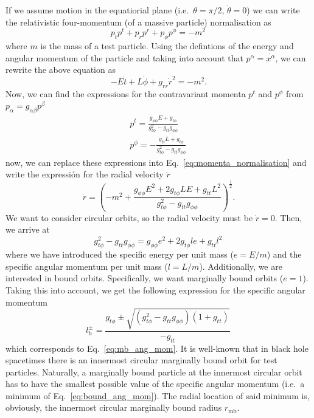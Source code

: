 \documentclass[twocolumn,aps,showpacs,showkeys,prd,superscriptaddress,byrevtex, amsmath]{revtex4-1}
\begin{document}
\begin{appendix}
If we assume motion in the equatiorial plane (i.e.~$\theta = \pi/2$, $\dot{\theta} = 0$) we can write the relativistic four-momentum (of a massive particle) normalisation as
\begin{equation}\label{eq:momenta_normalisation}
p_{t}p^t + p_{r}p^r + p_{\phi}p^{\phi} = -m^2\,
\end{equation}
where $m$ is the mass of a test particle. Using the defintions of the energy and angular momentum of the particle and taking into account that $p^{\alpha} = \dot{x^{\alpha}}$, we can rewrite the above equation as
\begin{equation}
-E \dot{t} + L \dot{\phi} + g_{rr} \dot{r}^2 = -m^2.
\end{equation}
Now, we can find the expressions for the contravariant momenta $p^{t}$ and $p^{\phi}$ from $p_{\alpha} = g_{\alpha \beta}p^{\beta}$
\begin{eqnarray}
p^{t} = \frac{g_{\phi\phi}E + g_{t\phi}}{g_{t\phi}^2-g_{tt}g_{\phi\phi}}
\\
p^{\phi} = -\frac{g_{tt}L+g_{t\phi}}{g_{t\phi}^2-g_{tt}g_{\phi\phi}}\,
\end{eqnarray}
now, we can replace these expressions into Eq.~\eqref{eq:momenta_normalisation} and write the expressión for the radial velocity $\dot{r}$
\begin{equation}\label{eq:radial_velocity}
\dot{r} = \left(-m^2+\frac{g_{\phi\phi}E^2+2 g_{t\phi}LE+g_{tt}L^2}{g_{t\phi}^2-g_{tt}g_{\phi\phi}}\right)^{\frac{1}{2}}.
\end{equation}
We want to consider circular orbits, so the radial velocity must be $\dot{r} = 0$. Then, we arrive at
\begin{equation}
g_{t\phi}^2-g_{tt}g_{\phi\phi} = g_{\phi\phi}e^2+2 g_{t\phi}le+g_{tt}l^2\,
\end{equation}
where we have introduced the specific energy per unit mass ($e = E/m$) and the specific angular momentum per unit mass ($l = L/m$). Additionally, we are interested in bound orbits. Specifically, we want marginally bound orbits ($e=1$). Taking this into account, we get the following expression for the specific angular momentum
\begin{equation}\label{eq:bound_ang_mom}
l^{\pm}_{\mathrm{b}} = \frac{g_{t\phi} \pm \sqrt{ (g_{t\phi}^2-g_{tt}g_{\phi\phi})  (1+g_{tt}) } }{-g_{tt}}\,
\end{equation}
which corresponds to Eq.~\eqref{eq:mb_ang_mom}. It is well-known that in black hole spacetimes there is an innermost circular marginally bound orbit for test particles. Naturally, a marginally bound particle at the innermost circular orbit has to have the smallest possible value of the specific angular momentum (i.e.~a minimum of Eq.~\eqref{eq:bound_ang_mom}). The radial location of said minimum is, obviously, the innermost circular marginally bound radius $r_{\mathrm{mb}}$.
\end{appendix}
\end{document}
